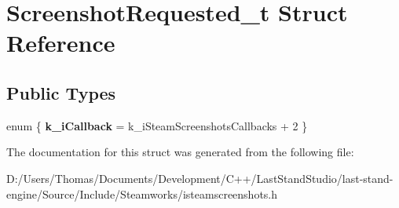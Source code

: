 \hypertarget{structScreenshotRequested__t}{}\section{Screenshot\+Requested\+\_\+t Struct Reference}
\label{structScreenshotRequested__t}
\subsection*{Public Types}
\begin{DoxyCompactItemize}
\item 
\hypertarget{structScreenshotRequested__t_a7e84fffb219ede42819760f7f473b80b}{}enum \{ {\bfseries k\+\_\+i\+Callback} = k\+\_\+i\+Steam\+Screenshots\+Callbacks + 2
 \}\label{structScreenshotRequested__t_a7e84fffb219ede42819760f7f473b80b}

\end{DoxyCompactItemize}


The documentation for this struct was generated from the following file\+:\begin{DoxyCompactItemize}
\item 
D\+:/\+Users/\+Thomas/\+Documents/\+Development/\+C++/\+Last\+Stand\+Studio/last-\/stand-\/engine/\+Source/\+Include/\+Steamworks/isteamscreenshots.\+h\end{DoxyCompactItemize}
